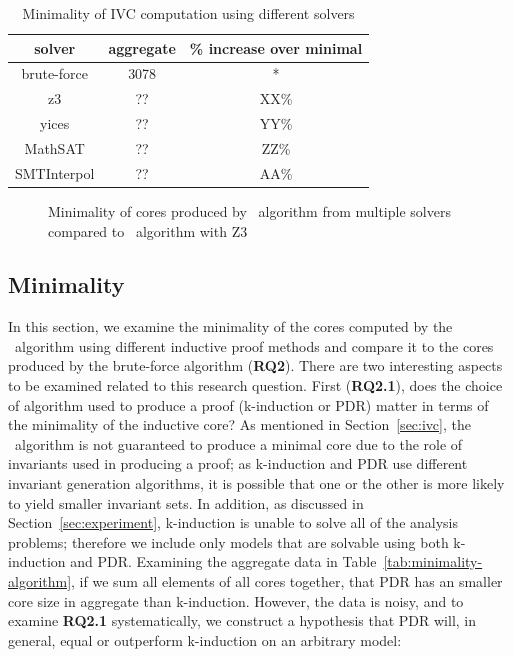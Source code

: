 \begin{table}
  \centering
  \begin{tabular}{ |c|c|c| }
    \hline
     solver & aggregate & \% increase over minimal \\
    \hline
    brute-force & 3078 & * \\
    z3 & ?? & XX\% \\
    yices & ?? & YY\% \\
    MathSAT & ?? & ZZ\% \\
    SMTInterpol & ?? & AA\% \\
    \hline
  \end{tabular}
  \caption{Minimality of IVC computation using different solvers}
  \label{tab:minimality-solver}
\end{table}

\begin{figure}
  \centering
  \caption{Minimality of cores produced by \ucalg\ algorithm from multiple solvers compared to \bfalg\ algorithm with Z3}
  \label{fig:minimality-all}
\end{figure}

\subsection{Minimality}
\label{sec:minimality}
In this section, we examine the minimality of the cores computed by the \ucalg\ algorithm using different inductive proof methods and compare it to the cores produced by the brute-force algorithm (\textbf{RQ2}).  There are two interesting aspects to be examined related to this research question.  First (\textbf{RQ2.1}), does the choice of algorithm used to produce a proof (k-induction or PDR) matter in terms of the minimality of the inductive core?   As mentioned in Section~\ref{sec:ivc}, the \ucalg\ algorithm is not guaranteed to produce a minimal core due to the role of invariants used in producing a proof; as k-induction and PDR use different invariant generation algorithms, it is possible that one or the other is more likely to yield smaller invariant sets.  In addition, as discussed in Section~\ref{sec:experiment}, k-induction is unable to solve all of the analysis problems; therefore we include only models that are solvable using both k-induction and PDR.  Examining the aggregate data in Table~\ref{tab:minimality-algorithm}, if we sum all elements of all cores together, that PDR has an smaller core size in aggregate than k-induction.  However, the data is noisy, and to examine \textbf{RQ2.1} systematically, we construct a hypothesis that PDR will, in general, equal or outperform k-induction on an arbitrary model:

